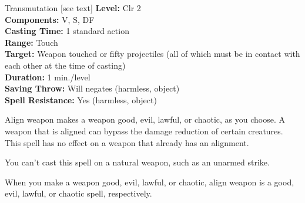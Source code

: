 {Transmutation [see text]}
{
	\textbf{Level:}
	Clr 2\\
	\textbf{Components:}
	V, S, DF\\
	\textbf{Casting Time:}
	1 standard action\\
	\textbf{Range:}
	Touch\\
	\textbf{Target:}
	Weapon touched or fifty projectiles (all of which must be in contact with each other at the time of casting)\\
	\textbf{Duration:}
	1 min./level\\
	\textbf{Saving Throw:}
	Will negates (harmless, object)\\
	\textbf{Spell Resistance:}
	Yes (harmless, object)\\
}
{
	Align weapon makes a weapon good, evil, lawful, or chaotic, as you choose. A weapon that is aligned can bypass the damage reduction of certain creatures. This spell has no effect on a weapon that already has an alignment.

	You can't cast this spell on a natural weapon, such as an unarmed strike.

	When you make a weapon good, evil, lawful, or chaotic, align weapon is a good, evil, lawful, or chaotic spell, respectively.

}
